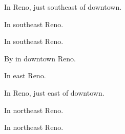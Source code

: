 

\begin{LocationList}

In Reno, just southeast of downtown.

In southeast Reno.

\Location{\GarageHQ \Garage}
In southeast Reno.

\Location{\GasStation \Gas}
By  in downtown Reno.

In east Reno.

In Reno, just east of downtown.

In northeast Reno.

In northeast Reno.

\end{LocationList}
